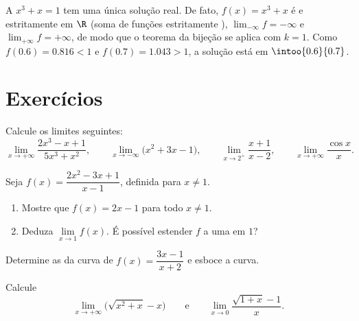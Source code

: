 \begin{example}\label{ex:g12:limcont:cubic}
A  $x^3 + x = 1$ tem uma única solução real. De fato,
$f(x) = x^3 + x$ é  e estritamente  em $\R$ (soma de
funções estritamente ), $\lim_{-\infty} f = -\infty$ e
$\lim_{+\infty} f = +\infty$, de modo que o teorema da bijeção se aplica
com $k = 1$. Como $f(0.6) = 0.816 < 1$ e $f(0.7) = 1.043 > 1$, a solução
está em $\intoo{0.6}{0.7}$.
\end{example}

\section{Exercícios}

\begin{exercise}[$\star$]\label{exo:g12:limcont:1}
Calcule os limites seguintes:
\[
\lim_{x\to+\infty} \frac{2x^3 - x + 1}{5x^3 + x^2}, \qquad
\lim_{x\to-\infty} \bigl(x^2 + 3x - 1\bigr), \qquad
\lim_{x\to 2^+} \frac{x+1}{x-2}, \qquad
\lim_{x\to+\infty} \frac{\cos x}{x}.
\]
\end{exercise}

\begin{exercise}[$\star$]\label{exo:g12:limcont:2}
Seja $f(x) = \dfrac{2x^2 - 3x + 1}{x - 1}$, definida para $x \neq 1$.
\begin{enumerate}
  \item Mostre que $f(x) = 2x - 1$ para todo $x \neq 1$.
  \item Deduza $\lim\limits_{x \to 1} f(x)$. É possível estender $f$ a uma
          em $1$?
\end{enumerate}
\end{exercise}

\begin{exercise}[$\star$]\label{exo:g12:limcont:3}
Determine as  da curva de $f(x) = \dfrac{3x - 1}{x + 2}$ e
esboce a curva.
\end{exercise}

\begin{exercise}[$\star\star$]\label{exo:g12:limcont:4}
Calcule
\[
\lim_{x\to+\infty} \bigl(\sqrt{x^2 + x} - x\bigr)
\qquad\text{e}\qquad
\lim_{x\to 0} \frac{\sqrt{1+x} - 1}{x}.
\]
\end{exercise}

